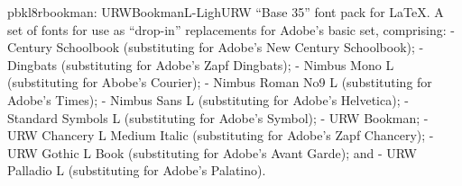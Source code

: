 \documentclass{ddltxtyp}
\begin{document}
\begin{package}{pbkl8r}{bookman: URWBookmanL-Ligh}{URW ``Base 35'' font pack for {\LaTeX}.}
A set of fonts for use as ``drop-in'' replacements for Adobe's
basic set, comprising: - Century Schoolbook (substituting for
Adobe's New Century Schoolbook); - Dingbats (substituting for
Adobe's Zapf Dingbats); - Nimbus Mono L (substituting for
Abobe's Courier); - Nimbus Roman No9 L (substituting for
Adobe's Times); - Nimbus Sans L (substituting for Adobe's
Helvetica); - Standard Symbols L (substituting for Adobe's
Symbol); - URW Bookman; - URW Chancery L Medium Italic
(substituting for Adobe's Zapf Chancery); - URW Gothic L Book
(substituting for Adobe's Avant Garde); and - URW Palladio L
(substituting for Adobe's Palatino).
\end{package}


\end{document}
